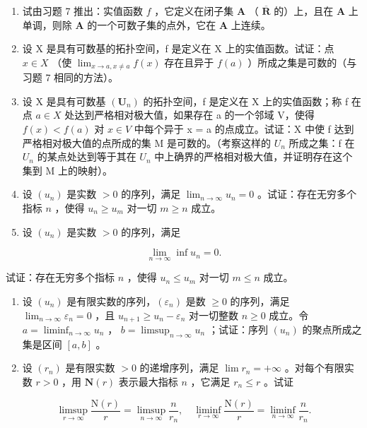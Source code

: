 \begin{enumerate}
\def\labelenumi{\arabic{enumi})}
\setcounter{enumi}{7}
\item
试由习题 7 推出：实值函数 \(f\) ，它定义在闭子集 \(\mathbf{A}\) （ \(\overline{\mathbf{R}}\) 的）上，且在 \(\mathbf{A}\) 上单调，则除 \(\mathbf{A}\) 的一个可数子集的点外，它在 \(\mathbf{A}\) 上连续。
\item
设 X 是具有可数基的拓扑空间，f 是定义在 X 上的实值函数。试证：点 \(x \in X\) （使 \(\lim_{x \to a, x \neq a} f(x)\) 存在且异于 \(f(a)\) ）所成之集是可数的（与习题 7 相同的方法）。
\item
设 X 是具有可数基 \((\mathbf{U}_{n})\) 的拓扑空间，f 是定义在 X 上的实值函数；称 f 在点 \(a \in X\) 处达到严格相对极大值，如果存在 a 的一个邻域 V，使得 \(f(x) < f(a)\) 对 \(x \in V\) 中每个异于 x = a 的点成立。试证：X 中使 f 达到严格相对极大值的点所成的集 M 是可数的。（考察这样的 \(U_{n}\) 所成之集：f 在 \(U_{n}\) 的某点处达到等于其在 \(U_{n}\) 中上确界的严格相对极大值，并证明存在这个集到 M 上的映射）。
\item
设 \((u_n)\) 是实数 \(>0\) 的序列，满足 \(\lim_{n\to \infty}u_n = 0\) 。试证：存在无穷多个指标 \(n\) ，使得 \(u_{n}\geqslant u_{m}\) 对一切 \(m\geqslant n\) 成立。
\item
设 \((u_n)\) 是实数 \(>0\) 的序列，满足
\end{enumerate}

\[
\lim _ {n \to \infty} \inf u _ {n} = 0.
\]

试证：存在无穷多个指标 \(n\) ，使得 \(u_{n} \leqslant u_{m}\) 对一切 \(m \leqslant n\) 成立。

\begin{enumerate}
\def\labelenumi{\arabic{enumi})}
\setcounter{enumi}{12}
\item
设 \((u_{n})\) 是有限实数的序列，\((\varepsilon_{n})\) 是数 \(\geqslant 0\) 的序列，满足 \(\lim_{n\to \infty}\varepsilon_n = 0\) ，且 \(u_{n + 1}\geqslant u_n - \varepsilon_n\) 对一切整数 \(n\geqslant 0\) 成立。令 \(a = \liminf_{n\to \infty}u_n\) ， \(b = \limsup_{n\to \infty}u_n\) ；试证：序列 \((u_{n})\) 的聚点所成之集是区间 \([a,b]\) 。
\item
设 \((r_n)\) 是有限实数 \(>0\) 的递增序列，满足 \(\lim r_n = +\infty\) 。对每个有限实数 \(r > 0\) ，用 \(\mathbf{N}(r)\) 表示最大指标 \(n\) ，它满足 \(r_n \leqslant r\) 。试证
\end{enumerate}

\[
\limsup _ {r \to \infty} \frac {\mathrm{N} (r)}{r} = \limsup _ {n \to \infty} \frac {n}{r _ {n}}, \quad \liminf _ {r \to \infty} \frac {\mathrm{N} (r)}{r} = \liminf _ {n \to \infty} \frac {n}{r _ {n}}.
\]

